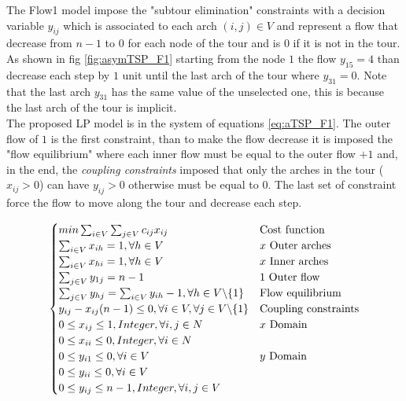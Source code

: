 The Flow1 model impose the "subtour elimination" constraints with a decision variable $ y_{ij} $ which is associated to each arch $ (i,j) \in V $ and represent a flow that decrease from $ n-1 $ to $ 0 $ for each node of the tour and is $ 0 $ if it is not in the tour. As shown in fig \ref{fig:asymTSP_F1} starting from the node $ 1 $ the flow $ y_{15} = 4 $ than decrease each step by $ 1 $ unit until the last arch of the tour where $ y_{31} = 0 $. Note that the last arch $ y_{31} $ has the same value of the unselected one, this is because the last arch of the tour is implicit. \\
The proposed LP model is in the system of equations \ref{eq:aTSP_F1}. The outer flow of $ 1 $ is the first constraint, than to make the flow decrease it is imposed the "flow equilibrium" where each inner flow must be equal to the outer flow $ +1 $ and, in the end, the \textit{coupling constraints} imposed that only the arches in the tour ($ x_{ij} > 0 $) can have $ y_{ij} > 0 $ otherwise must be equal to $ 0 $. The last set of constraint force the flow to move along the tour and decrease each step. 

\begin{equation}
\begin{cases}
min \sum_{i\in V}\sum_{j\in V} c_{ij}x_{ij}  & \text{Cost function} \\
\sum_{i\in V} x_{ih} = 1, \forall h \in V  & \text{$ x $ Outer arches} \\
\sum_{i\in V} x_{hi} = 1, \forall h \in V  & \text{$ x $ Inner arches} \\
\sum_{j\in V} y_{1j} = n-1  & \text{$ 1 $ Outer flow} \\
\sum_{j\in V} y_{hj} = \sum_{i \in V}y_{ih} - 1, \forall h \in V \backslash \{1\}  & \text{Flow equilibrium} \\
y_{ij} - x_{ij}(n-1) \le 0, \forall i \in V, \forall j \in V \backslash \{1\}  & \text{Coupling constraints} \\
0 \le x_{ij} \le 1, Integer, \forall i,j \in N  & \text{$ x $ Domain} \\
0 \le x_{ii} \le 0, Integer, \forall i \in N & \text{} \\
0 \le y_{i1} \le 0, \forall i \in V  & \text{$ y $ Domain} \\
0 \le y_{ii} \le 0, \forall i \in V  & \text{} \\
0 \le y_{ij} \le n-1, Integer, \forall i,j \in V  & \text{} 
\end{cases}
\label{eq:aTSP_F1}
\end{equation}


